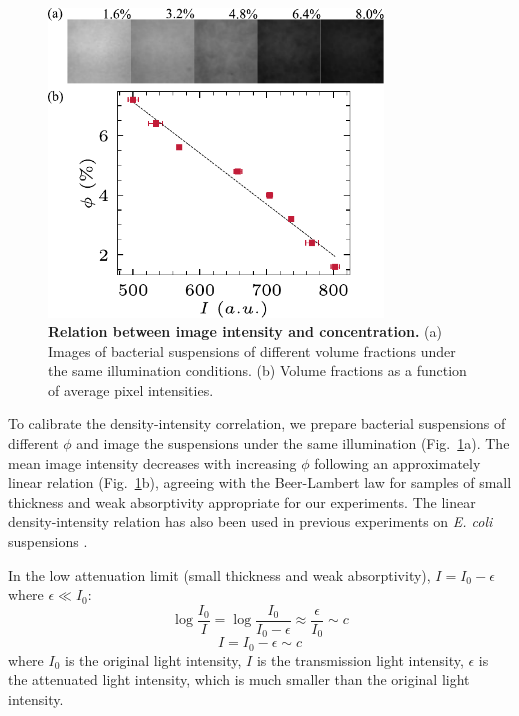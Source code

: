 \begin{figure}[ht]
\begin{center}
\includegraphics[width=3.5in]{figs/5-GNF/2.pdf}
\caption[Relation between Image Intensity and Concentration]
{
\textbf{Relation between image intensity and concentration.}
(a) Images of bacterial suspensions of different volume fractions under the same illumination conditions.
(b) Volume fractions as a function of average pixel intensities.
}
\label{fig:calibration}
\end{center}
\end{figure}

To calibrate the density-intensity correlation, we prepare bacterial suspensions of different $\phi$ and image the suspensions under the same illumination (Fig.~\ref{fig:calibration}a). The mean image intensity decreases with increasing $\phi$ following an approximately linear relation (Fig.~\ref{fig:calibration}b), agreeing with the Beer-Lambert law for samples of small thickness and weak absorptivity appropriate for our experiments. The linear density-intensity relation has also been used in previous experiments on \textit{E. coli} suspensions \cite{Wilson2011}.

In the low attenuation limit (small thickness and weak absorptivity), $I=I_0-\epsilon$ where $\epsilon\ll I_0$:
\begin{equation}
  \log \frac{I_0}{I} = \log \frac{I_0}{I_0 - \epsilon} \approx \frac{\epsilon}{I_0} \sim c
\end{equation}
\begin{equation}
I = I_0 - \epsilon \sim c
\end{equation}
where $I_0$ is the original light intensity, $I$ is the transmission light intensity, $\epsilon$ is the attenuated light intensity, which is much smaller than the original light intensity.

